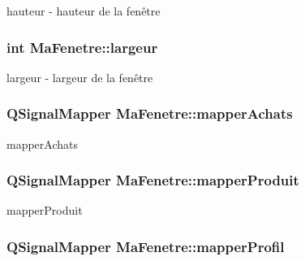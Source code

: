 hauteur -\/ hauteur de la fenêtre 

\hypertarget{class_ma_fenetre_abe37db89fd8895cc34ccc0f5cda67aaf}{
\subsubsection[{largeur}]{\setlength{\rightskip}{0pt plus 5cm}int Ma\-Fenetre\-::largeur\hspace{0.3cm}{\ttfamily [protected]}}}\label{class_ma_fenetre_abe37db89fd8895cc34ccc0f5cda67aaf}


largeur -\/ largeur de la fenêtre 

\hypertarget{class_ma_fenetre_aec38227203ed7fa15ad565077697d661}{
\subsubsection[{mapper\-Achats}]{\setlength{\rightskip}{0pt plus 5cm}Q\-Signal\-Mapper Ma\-Fenetre\-::mapper\-Achats\hspace{0.3cm}{\ttfamily [protected]}}}\label{class_ma_fenetre_aec38227203ed7fa15ad565077697d661}


mapper\-Achats 

\hypertarget{class_ma_fenetre_a7345ec3b89dedf18ae6297d77c5653b4}{
\subsubsection[{mapper\-Produit}]{\setlength{\rightskip}{0pt plus 5cm}Q\-Signal\-Mapper Ma\-Fenetre\-::mapper\-Produit\hspace{0.3cm}{\ttfamily [protected]}}}\label{class_ma_fenetre_a7345ec3b89dedf18ae6297d77c5653b4}


mapper\-Produit 

\hypertarget{class_ma_fenetre_a0629af8324c4d673fe70f55ead4e7b8a}{
\subsubsection[{mapper\-Profil}]{\setlength{\rightskip}{0pt plus 5cm}Q\-Signal\-Mapper Ma\-Fenetre\-::mapper\-Profil\hspace{0.3cm}{\ttfamily [protected]}}}\label{class_ma_fenetre_a0629af8324c4d673fe70f55ead4e7b8a}



